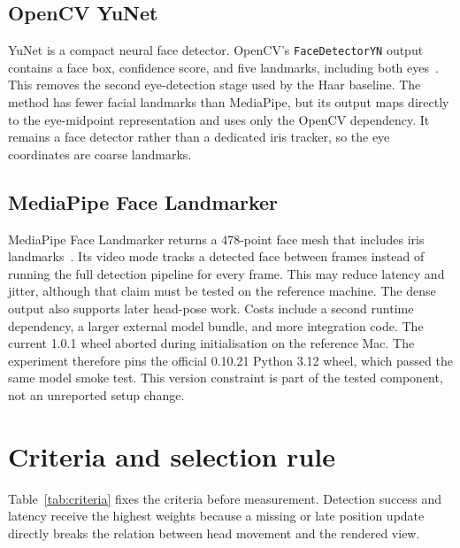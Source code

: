 \documentclass[9pt,a4paper,twocolumn]{article}
\begin{document}
\subsection{OpenCV YuNet}

YuNet is a compact neural face detector. OpenCV's \texttt{FaceDetectorYN} output contains a face box, confidence score, and five landmarks, including both eyes~\cite{yunet,opencvYuNet}. This removes the second eye-detection stage used by the Haar baseline. The method has fewer facial landmarks than MediaPipe, but its output maps directly to the eye-midpoint representation and uses only the OpenCV dependency. It remains a face detector rather than a dedicated iris tracker, so the eye coordinates are coarse landmarks.

\subsection{MediaPipe Face Landmarker}

MediaPipe Face Landmarker returns a 478-point face mesh that includes iris landmarks~\cite{mediapipeGuide,mediapipeModel}. Its video mode tracks a detected face between frames instead of running the full detection pipeline for every frame. This may reduce latency and jitter, although that claim must be tested on the reference machine. The dense output also supports later head-pose work. Costs include a second runtime dependency, a larger external model bundle, and more integration code. The current 1.0.1 wheel aborted during initialisation on the reference Mac. The experiment therefore pins the official 0.10.21 Python 3.12 wheel, which passed the same model smoke test. This version constraint is part of the tested component, not an unreported setup change.

\section{Criteria and selection rule}

Table~\ref{tab:criteria} fixes the criteria before measurement. Detection success and latency receive the highest weights because a missing or late position update directly breaks the relation between head movement and the rendered view.
\end{document}
